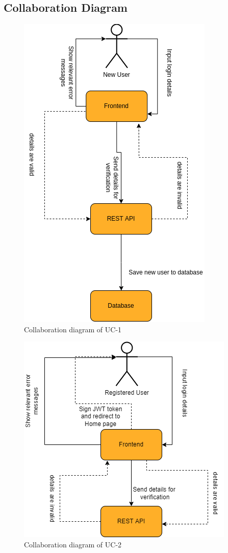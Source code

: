 \subsection{Collaboration Diagram}


\begin{figure}[H]
    \centering
    \includegraphics[scale=0.5]{./diagrams/collaboration/cd-1.png}
    \caption{Collaboration diagram of UC-1}
    \label{fig:cd-01}
    
\end{figure}


\begin{figure}[H]
    \centering
    \includegraphics[scale=0.5]{./diagrams/collaboration/cd-2.png}
    \caption{Collaboration diagram of UC-2}
    \label{fig:cd-02}
    
\end{figure}


